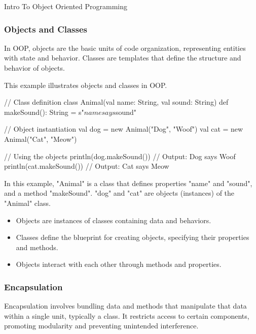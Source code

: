 \begin{notes}{Intro To Object Oriented Programming}
\begin{highlight}
    \end{highlight}
    
    \subsubsection*{Objects and Classes}
    
    In OOP, objects are the basic units of code organization, representing entities with state and behavior. Classes are templates that define the structure and behavior of objects.
    
    \begin{highlight}
    
        This example illustrates objects and classes in OOP.
    
    \begin{code}[Scala]
    // Class definition
    class Animal(val name: String, val sound: String) {
        def makeSound(): String = s"$name says $sound"
    }
    
    // Object instantiation
    val dog = new Animal("Dog", "Woof")
    val cat = new Animal("Cat", "Meow")
    
    // Using the objects
    println(dog.makeSound())  // Output: Dog says Woof
    println(cat.makeSound())  // Output: Cat says Meow
    \end{code}
    
        In this example, "Animal" is a class that defines properties "name" and "sound", and a method "makeSound". "dog" and "cat" are objects (instances) of the "Animal" class.
    
        \begin{itemize}
            \item Objects are instances of classes containing data and behaviors.
            \item Classes define the blueprint for creating objects, specifying their properties and methods.
            \item Objects interact with each other through methods and properties.
        \end{itemize}
    
    \end{highlight}
    
    \subsubsection*{Encapsulation}
    
    Encapsulation involves bundling data and methods that manipulate that data within a single unit, typically a class. It restricts access to certain components, promoting modularity and preventing unintended interference.
    

\end{notes}
